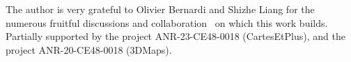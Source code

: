 \documentclass[letter]{amsart}
\numberwithin{theo}{section}
\theoremstyle{remark}
\begin{document}
\bigskip

 The author is very grateful to Olivier Bernardi and Shizhe Liang for the numerous fruitful discussions and collaboration~\cite{BernardiFL23,OB-EF-SL:Grand-Schnyder} on which this work builds. Partially supported by the project ANR-23-CE48-0018 (CartesEtPlus), and the project ANR-20-CE48-0018 (3DMaps). 





\end{document}

